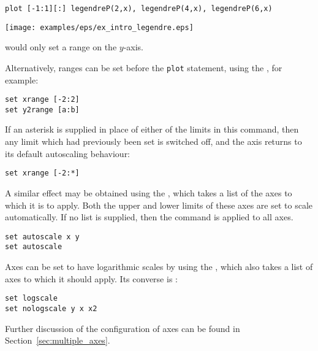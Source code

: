 \begin{verbatim}
plot [-1:1][:] legendreP(2,x), legendreP(4,x), legendreP(6,x)
\end{verbatim}
\begin{center}
\texttt{[image: examples/eps/ex\_intro\_legendre.eps]}
\end{center}

\noindent would only set a range on the $y$-axis.

Alternatively, ranges can be set before the {\tt plot} statement, using the
, for example:

\begin{verbatim}
set xrange [-2:2]
set y2range [a:b]
\end{verbatim}

If an asterisk is supplied in place of either of the limits in this command, then
any limit which had previously been set is switched off, and the axis returns to
its default autoscaling behaviour:

\begin{verbatim}
set xrange [-2:*]
\end{verbatim}

\noindent A similar effect may be obtained using the ,
which takes a list of the axes to which it is to apply. Both the upper and
lower limits of these axes are set to scale automatically. If no list is
supplied, then the command is applied to all axes.

\begin{verbatim}
set autoscale x y
set autoscale
\end{verbatim}

Axes can be set to have logarithmic scales by using the ,
which also takes a list of axes to which it should apply. Its converse is
:

\begin{verbatim}
set logscale
set nologscale y x x2
\end{verbatim}

Further discussion of the configuration of axes can be found in
Section~\ref{sec:multiple_axes}.

